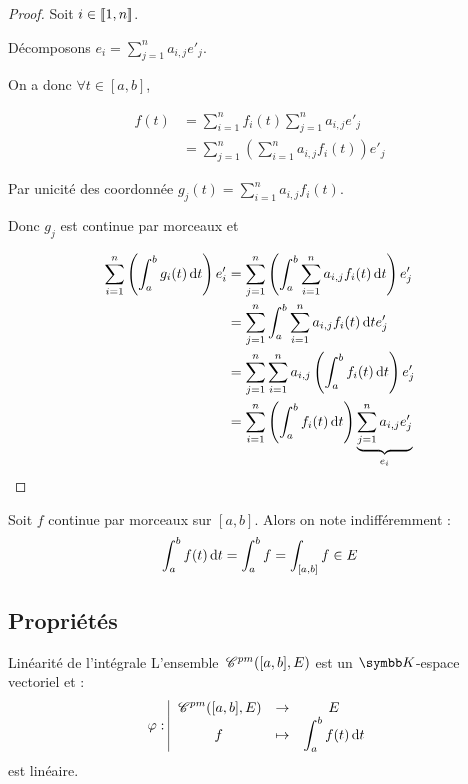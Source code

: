 \begin{proof}
    Soit $i \in [\![1, n]\!]$. 

    Décomposons $e_i = \displaystyle \sum_{j=1}^n a_{i,j} e'_j$.

    On a donc $\forall t \in [a, b]$, 

    \begin{align*}
        f(t) & = \sum_{i=1}^n f_i(t) \sum_{j=1}^n a_{i,j} e'_j \\
        & = \sum_{j=1}^n \left( \sum_{i=1}^n a_{i,j} f_i(t) \right) e'_j
    \end{align*}

    Par unicité des coordonnée $\displaystyle g_j(t) = \sum_{i=1}^n a_{i,j} f_i(t)$.

    Donc $g_j$ est continue par morceaux et 

    \begin{align*}
        \sum_{i=1}^n \left( \int_a^b g_i(t) \,\mathrm{d}t \right) e'_i & = \sum_{j=1}^n \left( \int_a^b \sum_{i=1}^n a_{i,j} f_i(t) \,\mathrm{d}t \right) e'_j \\
            & = \sum_{j=1}^n \int_a^b \sum_{i=1}^n a_{i,j} f_i(t) \,\mathrm{d}t e'_j \\
            & = \sum_{j=1}^n \sum_{i=1}^n a_{i,j} \left( \int_a^b f_i(t) \,\mathrm{d}t \right) e'_j \\
            & = \sum_{i=1}^n \left( \int_a^b f_i(t) \,\mathrm{d}t \right) \underbrace{\sum_{j=1}^n a_{i,j} e'_j}_{e_i} \\ 
    \end{align*}
\end{proof}

\begin{remarque}
Soit $f$ continue par morceaux sur $[a, b]$. Alors on note indifféremment :
\[\int_a^b f(t) \,\mathrm{d}t = \int_a^b f = \int_{[a, b]} f \in E\]
\end{remarque}

\subsection{Propriétés}

\begin{proposition}{Linéarité de l'intégrale}{}
    L'ensemble $\,\mathscr C^{pm}([a, b], E)$ est un $\K$-espace vectoriel et :
    \[\varphi: \space \begin{array}{|ccc} \displaystyle \,\mathscr C^{pm}([a, b], E) & \to & \displaystyle E \\ \displaystyle f & \mapsto & \displaystyle \int_a^b f(t) \,\mathrm{d}t \end{array}\]
    est linéaire. 
\end{proposition}


